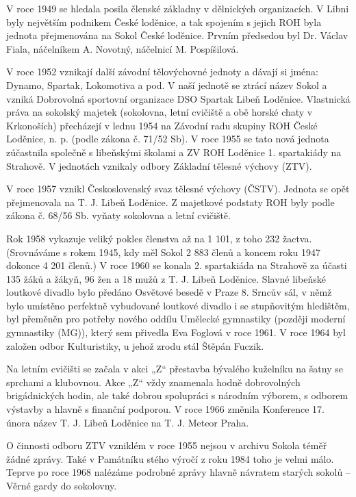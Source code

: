 V roce 1949 se hledala posila členské základny v dělnických
organizacích. V Libni byly největším podnikem České loděnice, a tak
spojením s jejich ROH byla jednota přejmenována na Sokol České loděnice.
Prvním předsedou byl Dr. Václav Fiala, náčelníkem A. Novotný, náčelnicí
M. Pospíšilová.

V roce 1952 vznikají další závodní tělovýchovné jednoty a dávají si
jména: Dynamo, Spartak, Lokomotiva a pod. V naší jednotě se ztrácí název
Sokol a vzniká Dobrovolná sportovní organizace DSO Spartak Libeň
Loděnice. Vlastnická práva na sokolský majetek (sokolovna, letní
cvičiště a obě horské chaty v Krkonoších) přecházejí v lednu 1954 na
Závodní radu skupiny ROH České Loděnice, n. p. (podle zákona č. 71/52
Sb). V roce 1955 se tato nová jednota zúčastnila společně s libeňskými
školami a ZV ROH Loděnice 1. spartakiády na Strahově. V jednotách
vznikaly odbory Základní tělesné výchovy (ZTV).

V roce 1957 vznikl Československý svaz tělesné výchovy (ČSTV). Jednota
se opět přejmenovala na T. J. Libeň Loděnice. Z majetkové podstaty ROH
byly podle zákona č. 68/56 Sb. vyňaty sokolovna a letní cvičiště.

Rok 1958 vykazuje veliký pokles členstva až na 1 101, z toho 232 žactva.
(Srovnáváme s rokem 1945, kdy měl Sokol 2 883 členů a koncem roku 1947
dokonce 4 201 členů.) V roce 1960 se konala 2. spartakiáda na Strahově
za účasti 135 žáků a žákyň, 96 žen a 18 mužů z T. J. Libeň Loděnice.
Slavné libeňské loutkové divadlo bylo předáno Osvětové besedě v Praze 8.
Srncův sál, v němž bylo umístěno perfektně vybudované loutkové divadlo i
se stupňovitým hledištěm, byl přeměněn pro potřeby nového oddílu
Umělecké gymnastiky (později moderní gymnastiky (MG)), který sem
přivedla Eva Foglová v roce 1961. V roce 1964 byl založen odbor
Kulturistiky, u jehož zrodu stál Štěpán Fuczik.

Na letním cvičišti se začala v akci „Z`` přestavba bývalého kuželníku na
šatny se sprchami a klubovnou. Akce „Z`` vždy znamenala hodně
dobrovolných brigádnických hodin, ale také dobrou spolupráci s národním
výborem, s odborem výstavby a hlavně s finanční podporou. V roce 1966
změnila Konference 17. února název T. J. Libeň Loděnice na T. J. Meteor
Praha.

O činnosti odboru ZTV vzniklém v roce 1955 nejsou v archivu Sokola téměř
žádné zprávy. Také v Památníku stého výročí z roku 1984 toho je velmi
málo. Teprve po roce 1968 nalézáme podrobné zprávy hlavně návratem
starých sokolů -- Věrné gardy do sokolovny.

